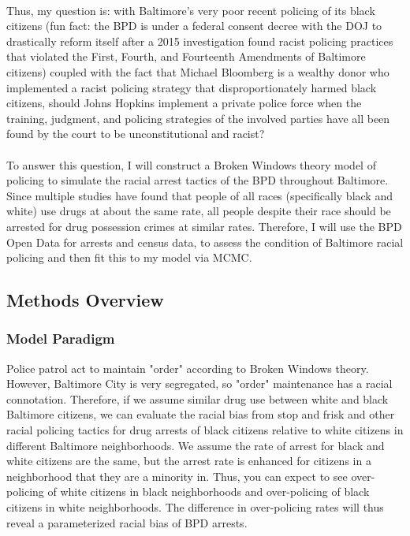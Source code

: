 \documentclass[10pt]{article}
\begin{document}
\\
Thus, my question is: with Baltimore's very poor recent policing of its black citizens (fun fact: the BPD is under a federal consent decree with the DOJ to drastically reform itself after a 2015 investigation found racist policing practices that violated the First, Fourth, and Fourteenth Amendments of Baltimore citizens) coupled with the fact that Michael Bloomberg is a wealthy donor who implemented a racist policing strategy that disproportionately harmed black citizens, should Johns Hopkins implement a private police force when the training, judgment, and policing strategies of the involved parties have all been found by the court to be unconstitutional and racist?\\
\\
To answer this question, I will construct a Broken Windows theory model of policing to simulate the racial arrest tactics of the BPD throughout Baltimore. Since multiple studies have found that people of all races (specifically black and white) use drugs at about the same rate, all people despite their race should be arrested for drug possession crimes at similar rates. Therefore, I will use the BPD Open Data for arrests and census data, to  assess the condition of Baltimore racial policing and then fit this to my model via MCMC.

\subsection*{Methods Overview}
\subsubsection{Model Paradigm}
Police patrol act to maintain "order" according to Broken Windows theory. However, Baltimore City is very segregated, so "order" maintenance has a racial connotation. Therefore, if we assume similar drug use between white and black Baltimore citizens, we can evaluate the racial bias from stop and frisk and other racial policing tactics for drug arrests of black citizens relative to white citizens in different Baltimore neighborhoods. We assume the rate of arrest for black and white citizens are the same, but the arrest rate is enhanced for citizens in a neighborhood that they are a minority in. Thus, you can expect to see over-policing of white citizens in black neighborhoods and over-policing of black citizens in white neighborhoods. The difference in over-policing rates will thus reveal a parameterized racial bias of BPD arrests.
\end{document}
